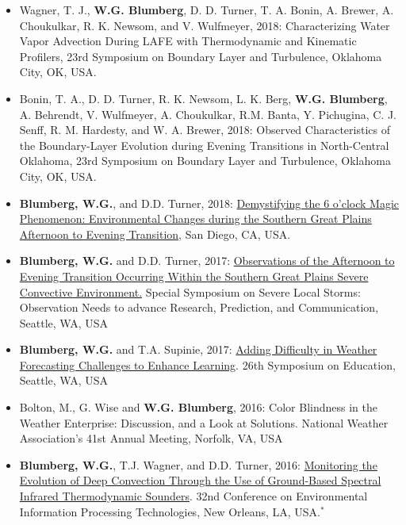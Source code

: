 \documentclass[10pt]{res} %
\begin{document}
\begin{resume}
\vspace{15pt} %
\begin{itemize} \itemsep 2pt %

\item Wagner, T. J., \textbf{W.G. Blumberg}, D. D. Turner, T. A. Bonin, A. Brewer, A. Choukulkar, R. K. Newsom, and V. Wulfmeyer, 2018: Characterizing Water Vapor Advection During LAFE with Thermodynamic and Kinematic Profilers, 23rd Symposium on Boundary Layer and Turbulence, Oklahoma City, OK, USA. 
\item Bonin, T. A., D. D. Turner, R. K. Newsom, L. K. Berg, \textbf{W.G. Blumberg}, A. Behrendt, V. Wulfmeyer, A. Choukulkar, R.M. Banta, Y. Pichugina, C. J. Senff, R. M. Hardesty, and W. A. Brewer, 2018: Observed Characteristics of the Boundary-Layer Evolution during Evening Transitions in North-Central Oklahoma, 23rd Symposium on Boundary Layer and Turbulence, Oklahoma City, OK, USA. 
\item \textbf{Blumberg, W.G.}, and D.D. Turner, 2018: \href{https://ams.confex.com/ams/17MESO/webprogram/Paper320204.html}{Demystifying the 6 o'clock Magic Phenomenon: Environmental Changes during the Southern Great Plains Afternoon to Evening Transition}, San Diego, CA, USA.
\item \textbf{Blumberg, W.G.} and D.D. Turner, 2017: \href{https://ams.confex.com/ams/97Annual/webprogram/Paper313841.html}{Observations of the Afternoon to Evening Transition Occurring Within the Southern Great Plains Severe Convective Environment.} Special Symposium on Severe Local Storms: Observation Needs to advance Research, Prediction, and Communication, Seattle, WA, USA
\item \textbf{Blumberg, W.G.} and T.A. Supinie, 2017: \href{https://ams.confex.com/ams/97Annual/webprogram/Paper315011.html}{Adding Difficulty in Weather Forecasting Challenges to Enhance Learning}. 26th Symposium on Education, Seattle, WA, USA
\item Bolton, M., G. Wise and \textbf{W.G. Blumberg}, 2016: Color Blindness in the Weather Enterprise: Discussion, and a Look at Solutions. National Weather Association's 41st Annual Meeting, Norfolk, VA, USA
\item \textbf{Blumberg, W.G.}, T.J. Wagner, and D.D. Turner, 2016: \href{https://ams.confex.com/ams/96Annual/webprogram/Paper284726.html}{Monitoring the Evolution of Deep Convection Through the Use of Ground-Based Spectral Infrared Thermodynamic Sounders}. 32nd Conference on Environmental Information Processing Technologies, New Orleans, LA, USA.$^{*}$

\end{itemize}
\end{resume}
\end{document}
